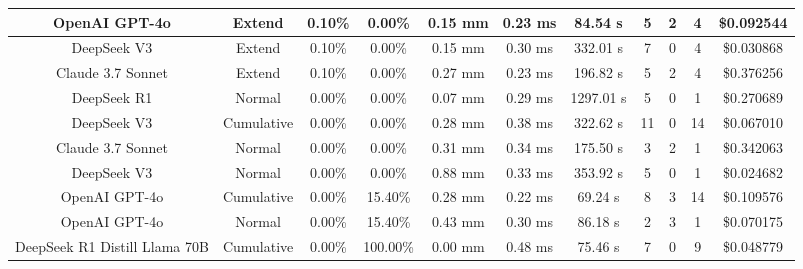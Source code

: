 \begin{table}[H]
\begin{center}
\begin{tabular}{|c|c|c|c|c|c|c|c|c|c|c|}
    \hline
    OpenAI GPT-4o & Extend & 0.10\% & 0.00\% & 0.15 mm & 0.23 ms & 84.54 s & 5 & 2 & 4 & \$0.092544 \\
    \hline
    DeepSeek V3 & Extend & 0.10\% & 0.00\% & 0.15 mm & 0.30 ms & 332.01 s & 7 & 0 & 4 & \$0.030868 \\
    \hline
    Claude 3.7 Sonnet & Extend & 0.10\% & 0.00\% & 0.27 mm & 0.23 ms & 196.82 s & 5 & 2 & 4 & \$0.376256 \\
    \hline
    DeepSeek R1 & Normal & 0.00\% & 0.00\% & 0.07 mm & 0.29 ms & 1297.01 s & 5 & 0 & 1 & \$0.270689 \\
    \hline
    DeepSeek V3 & Cumulative & 0.00\% & 0.00\% & 0.28 mm & 0.38 ms & 322.62 s & 11 & 0 & 14 & \$0.067010 \\
    \hline
    Claude 3.7 Sonnet & Normal & 0.00\% & 0.00\% & 0.31 mm & 0.34 ms & 175.50 s & 3 & 2 & 1 & \$0.342063 \\
    \hline
    DeepSeek V3 & Normal & 0.00\% & 0.00\% & 0.88 mm & 0.33 ms & 353.92 s & 5 & 0 & 1 & \$0.024682 \\
    \hline
    OpenAI GPT-4o & Cumulative & 0.00\% & 15.40\% & 0.28 mm & 0.22 ms & 69.24 s & 8 & 3 & 14 & \$0.109576 \\
    \hline
    OpenAI GPT-4o & Normal & 0.00\% & 15.40\% & 0.43 mm & 0.30 ms & 86.18 s & 2 & 3 & 1 & \$0.070175 \\
    \hline
    DeepSeek R1 Distill Llama 70B & Cumulative & 0.00\% & 100.00\% & 0.00 mm & 0.48 ms & 75.46 s & 7 & 0 & 9 & \$0.048779 \\
    \hline
\end{tabular}
\label{Results-Position-2-5}
\end{center}
\end{table}

